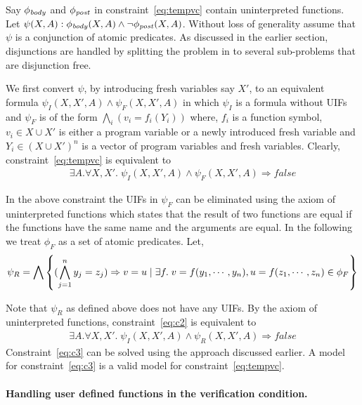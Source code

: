 \documentclass[a4paper,10pt]{article}
\begin{document}
Say $\mathit{\phi_{body}}$ and $\mathit{\phi_{post}}$ in constraint~\ref{eq:tempvc} contain uninterpreted functions.
Let $\psi(X,A): \mathit{\phi_{body}}(X,A) \wedge \neg \mathit{\phi_{post}}(X,A)$.
Without loss of generality assume that $\psi$ is a conjunction of atomic predicates.
As discussed in the earlier section, disjunctions are handled by splitting the problem in to several sub-problems that are disjunction free.

We first convert $\psi$, by introducing fresh variables say $X'$, 
to an equivalent formula $\psi_{I}(X,X',A) \wedge \psi_{F}(X,X',A)$ in which
$\psi_I$ is a formula without UIFs and 
$\psi_{F}$ is of the form $\bigwedge_i (v_i = f_i(Y_i))$ where, $f_i$ is a function symbol,  
$v_i \in X \cup X'$ is either a program variable or a newly introduced fresh variable 
and $Y_i \in (X \cup X')^n$ is a vector of program variables and fresh variables.  
Clearly, constraint~\ref{eq:tempvc} is equivalent to 
%
\begin{align}
\exists A. \forall X,X'. \; \psi_{I}(X,X',A) \wedge \psi_{F}(X,X',A) \Rightarrow false \label{eq:c2}
\end{align}

In the above constraint the UIFs in $\psi_{F}$ can be eliminated using the axiom of uninterpreted functions which states that the result of  two functions are equal if the functions have the same name and the arguments are equal. In the following we treat $\phi_F$ as a set of atomic predicates.
Let,
%
\begin{align}
\psi_R = \bigwedge \left\lbrace (\bigwedge \limits_{j=1}^{n} y_j = z_j) \Rightarrow v = u \; | \; \exists f. \; v = f(y_1,\cdots,y_n), u = f(z_1,\cdots,z_n) \in \phi_F \right\rbrace  
\end{align}

Note that $\psi_R$ as defined above does not have any UIFs. By the axiom of uninterpreted functions,  constraint~\ref{eq:c2} is equivalent to 
%
\begin{align}
\exists A. \forall X,X'. \; \psi_{I}(X,X',A) \wedge \psi_{R}(X,X',A)  \Rightarrow false \label{eq:c3}
\end{align}
%
Constraint~\ref{eq:c3} can be solved using the approach discussed earlier. A model for constraint~\ref{eq:c3} is a valid model for constraint~\ref{eq:tempvc}.

\paragraph{Handling user defined functions in the verification condition.}
\end{document}
